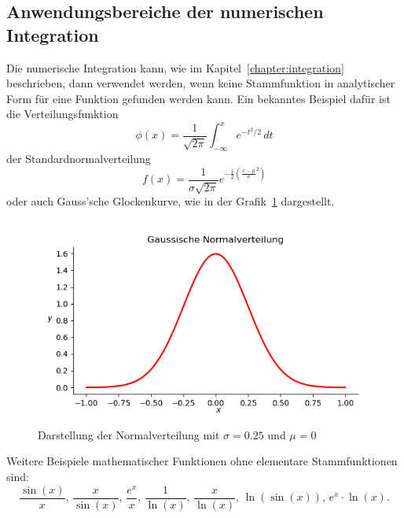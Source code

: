 \subsection{Anwendungsbereiche der numerischen Integration \label{quadratur:subsection:anwendungsbereiche}}
Die numerische Integration kann, wie im Kapitel~\ref{chapter:integration} beschrieben, dann verwendet
werden, wenn keine Stammfunktion in analytischer Form für eine Funktion gefunden werden kann.
Ein bekanntes Beispiel dafür ist die Verteilungsfunktion
\begin{equation}
    \phi(x) 
    =
    \frac{1}{\sqrt{2\pi}}
    \int_{-\infty}^x e^{-t^2/2}\,dt
\end{equation}
der Standardnormalverteilung
\begin{equation}
    f(x)
    = 
    \frac{1}{\sigma \sqrt{2\pi}}e^{-\frac{1}{2}(\frac{x-\mu}{\sigma}^{2})}
\end{equation}
oder auch Gauss'sche Glockenkurve, wie in der Grafik~\ref{quadratur:figure:gaussdistribution} dargestellt. 
\begin{figure}
    \centering
    \includegraphics[scale=0.7]{papers/quadratur/figures/GaussDistribution1}
    \caption{Darstellung der Normalverteilung mit $\sigma=0.25$ und $\mu=0$
    \label{quadratur:figure:gaussdistribution}}
\end{figure}
Weitere Beispiele mathematischer Funktionen ohne elementare Stammfunktionen sind:
\[
    \frac{\sin(x)}{x}, \, 
    \frac{x}{\sin(x)}, \, 
    \frac{e^{x}}{x},  \,
    \frac{1}{\operatorname{ln}(x)}, \, 
    \frac{x}{\operatorname{ln}(x)},  \,
    \operatorname{ln}(\sin(x)),  \,
    e^{x}\cdot\operatorname{ln}(x).
\]
